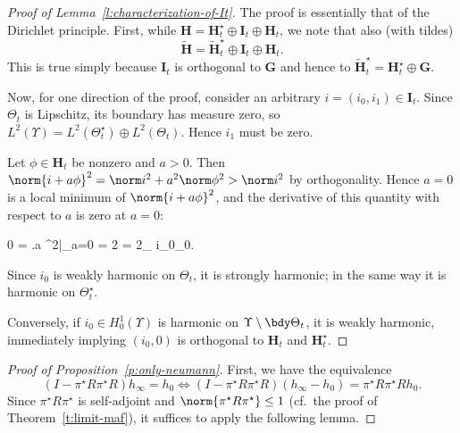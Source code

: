 \documentclass[10pt]{article}
\theoremstyle{plain}
\theoremstyle{definition}
\theoremstyle{remark}
\numberwithin{theorem}{section}
\numberwithin{example}{section}
\numberwithin{equation}{section}
\numberwithin{figure}{section}
\let\gradient\nabla				%
\begin{document}
%
%
\begin{proof}[Proof of Lemma~\ref{l:characterization-of-It}]
	The proof is essentially that of the Dirichlet principle. First, while ${\mathbf H} = {\mathbf H}_t^\star \oplus \mathbf I_t\oplus {\mathbf H}_t$, we note that also (with tildes)
	\begin{equation}
		\tilde{\mathbf H} = \tilde{\mathbf H}_t^\star \oplus \mathbf I_t\oplus {\mathbf H}_t.
	\end{equation}
	This is true simply because $\mathbf I_t$ is orthogonal to $\mathbf G$ and hence to $\tilde{\mathbf H}_t^\star={\mathbf H}_t^\star\oplus \mathbf G$.
	
	Now, for one direction of the proof, consider an arbitrary $i=(i_0,i_1)\in\mathbf I_t$. Since $\Theta_t$ is Lipschitz, its boundary has measure zero, so $L^2(\Upsilon)=L^2(\Theta_{t}^\star)\oplus L^2(\Theta_{t})$. Hence $i_1$ must be zero.
	
	Let $\phi\in \mathbf H_t$ be nonzero and $a>0$. Then $\norm{i+a\phi}^2=\norm i^2+a^2\norm\phi^2>\norm i^2$ by orthogonality. Hence $a=0$ is a local minimum of $\norm{i+a\phi}^2$, and the derivative of this quantity with respect to $a$ is zero at $a=0$:
	
	\begin{nalign}
		0 = \left.\smd a ^2\right|_{a=0} = 2 = 2\int_{\mathrlap{\Upsilon}} \quad \gradient i_0\cdot\gradient\phi_0.
		\label{e:i0-weakly-harmonic}
	\end{nalign}
	Since $i_0$ is weakly harmonic on $\Theta_{t}$, it is strongly harmonic; in the same way it is harmonic on $\Theta_{t}^\star$.
	
	Conversely, if $i_0\in H^1_0(\Upsilon)$ is harmonic on $\Upsilon\setminus\bdy\Theta_t$, it is weakly harmonic, immediately implying $(i_0,0)$ is orthogonal to $\mathbf H_t$ and $\mathbf H_t^\star$.
\end{proof}



\begin{proof}[Proof of Proposition~\ref{p:only-neumann}]
	First, we have the equivalence
	\begin{equation}
		(I-\pi^\star R\pi^\star R)h_\infty=h_0
		\iff
		(I-\pi^\star R\pi^\star R)(h_\infty-h_0)=\pi^\star R\pi^\star Rh_0.
	\end{equation}
	Since $\pi^\star R\pi^\star$ is self-adjoint and $\norm{\pi^\star R\pi^\star}\leq 1$ (cf.\ the proof of Theorem~\ref{t:limit-maf}),
	it suffices to apply the following lemma.
\end{proof}
\end{document}
